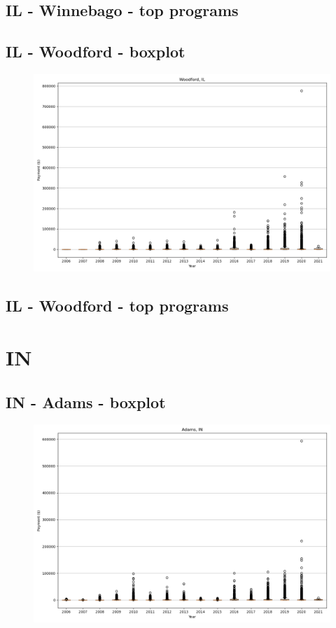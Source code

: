 \subsection*{IL - Winnebago - top programs}

\newpage
\subsection*{IL - Woodford - boxplot}
\begin{figure}[h]
\centering
\includegraphics[width=7in]{../output/boxplots/counties/Woodford-IL_boxplot.png}
\end{figure}


\subsection*{IL - Woodford - top programs}

\newpage
\section*{IN}
\subsection*{IN - Adams - boxplot}
\begin{figure}[h]
\centering
\includegraphics[width=7in]{../output/boxplots/counties/Adams-IN_boxplot.png}
\end{figure}


